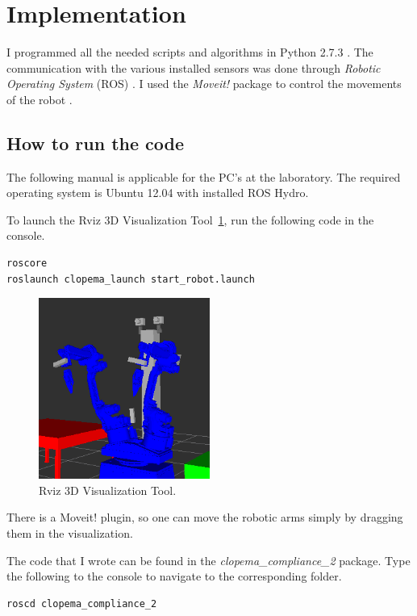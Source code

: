 \graphicspath{{Img/implementation/}}
\section{Implementation}
     I programmed all the needed scripts and algorithms in Python 2.7.3 \cite{Python}. The communication with the various installed sensors was done through \emph{Robotic Operating System} (ROS) \cite{ROS2009}. I used the \emph{Moveit!} package to control the movements of the robot \cite{moveit}.

    \subsection{How to run the code}
        The following manual is applicable for the PC's at the \CloPeMa\/ laboratory. The required operating system is Ubuntu 12.04 with installed ROS Hydro.

        To launch the \CloPeMa\/ Rviz 3D Visualization Tool~\ref{fig:rviz}, run the following code in the console.

        \begin{lstlisting}[language=bash, label={lst:StartClopema}]
roscore
roslaunch clopema_launch start_robot.launch
        \end{lstlisting}

        \begin{figure}[h]
        \includegraphics[width=0.5\textwidth]{rviz.png}
        \centering
        \caption{Rviz 3D Visualization Tool.}
        \label{fig:rviz}
        \end{figure}


        There is a Moveit! plugin, so one can move the robotic arms simply by dragging them in the visualization.

        The code that I wrote can be found in the \textit{clopema\_compliance\_2} package. Type the following to the console to navigate to the corresponding folder.
                \begin{lstlisting}[language=bash, numbers=none]
roscd clopema_compliance_2
                \end{lstlisting}


